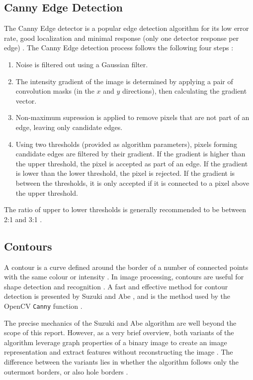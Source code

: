 \subsection{Canny Edge Detection}

The Canny Edge detector is a popular edge detection algorithm for its low error rate, good localization and minimal response (only one detector response per edge) \cite{opencv_canny}. The Canny Edge detection process follows the following four steps \cite{opencv_canny}:
\begin{enumerate}
  \item Noise is filtered out using a Gaussian filter.

  \item The intensity gradient of the image is determined by applying a pair of convolution masks (in the $x$ and $y$ directions), then calculating the gradient vector.

  \item Non-maximum supression is applied to remove pixels that are not part of an edge, leaving only candidate edges.

  \item Using two thresholds (provided as algorithm parameters), pixels forming candidate edges are filtered by their gradient. If the gradient is higher than the upper threshold, the pixel is accepted as part of an edge. If the gradient is lower than the lower threshold, the pixel is rejected. If the gradient is between the thresholds, it is only accepted if it is connected to a pixel above the upper threshold.

\end{enumerate}

The ratio of upper to lower thresholds is generally recommended to be between 2:1 and 3:1 \cite{opencv_canny}.

\subsection{Contours}

A contour is a curve defined around the border of a number of connected points with the same colour or intensity \cite{opencv_contour}. In image processing, contours are useful for shape detection and recognition \cite{opencv_contour}. A fast and effective method for contour detection is presented by Suzuki and Abe \cite{suzuki_1985}, and is the method used by the OpenCV \texttt{Canny} function \cite{opencv_bib}.

The precise mechanics of the Suzuki and Abe \cite{suzuki_1985} algorithm are well beyond the scope of this report. However, as a very brief overview, both variants of the algorithm leverage graph properties of a binary image to create an image representation and extract features without reconstructing the image \cite{suzuki_1985}. The difference between the variants lies in whether the algorithm follows only the outermost borders, or also hole borders \cite{suzuki_1985}.

